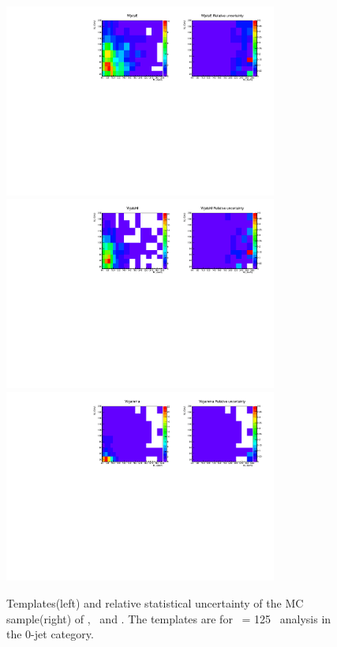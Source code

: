 \begin{figure}[htp]
\centering
\includegraphics[width=0.8\textwidth]{figures/2dtemplate_WjetsE_mH125_0j.pdf}
\includegraphics[width=0.8\textwidth]{figures/2dtemplate_WjetsM_mH125_0j.pdf}
\includegraphics[width=0.8\textwidth]{figures/2dtemplate_Wgamma_mH125_0j.pdf}
\caption{Templates(left) and relative statistical uncertainty of the MC sample(right) 
of \WjetsE, \WjetsM\ and \wgamma. 
The templates are for \mHi\ = 125 \GeV\ analysis in the 0-jet category.}
\label{fig:2dtemplate_125_0j_3}
\end{figure}

